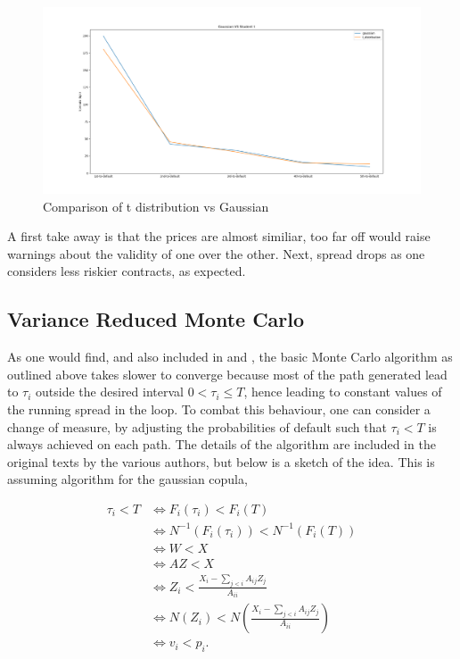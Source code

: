 \documentclass[a4paper,12pt]{article}
\begin{document}
\begin{figure}[h]

\centering
\includegraphics[width=1\textwidth]{tstat_vs_gaussian}
\caption{Comparison of t distribution vs Gaussian}
\label{image-t_vs_gaus}

\end{figure} 

\clearpage

A first take away is that the prices are almost similiar, too far off would raise warnings about the validity of one over the other. Next, spread drops as one considers less riskier contracts, as expected. 

\subsection{Variance Reduced Monte Carlo}

As one would find, and also included in \cite{joshi_kainth} and \cite{milicia}, the basic Monte Carlo algorithm as outlined above takes slower to converge because most of the path generated lead to $\tau_i$ outside the desired interval $0 < \tau_i \leq T$, hence leading to constant values of the running spread in the loop. To combat this behaviour, one can consider a change of measure, by adjusting the probabilities of default such that $\tau_i < T$ is always achieved on each path.  The details of the algorithm are included in the original texts by the various authors, but below is a sketch of the idea. This is assuming algorithm for the gaussian copula, 

\begin{align*}
\tau_i < T  & \Leftrightarrow F_i(\tau_i) < F_i(T) \\
 & \Leftrightarrow N^{-1}( F_i(\tau_i)) < N^{-1}(F_i(T)) \\
 & \Leftrightarrow W < X \\
 & \Leftrightarrow AZ < X \\
 & \Leftrightarrow Z_i < \frac{X_i - \sum\limits_{j < i}A_{ij}Z_j}{A_{ii}} \\
 & \Leftrightarrow N(Z_i) < N\left(\frac{X_i - \sum\limits_{j < i}A_{ij}Z_j}{A_{ii}} \right) \\
 & \Leftrightarrow v_i < p_i .
\end{align*}
\end{document}
